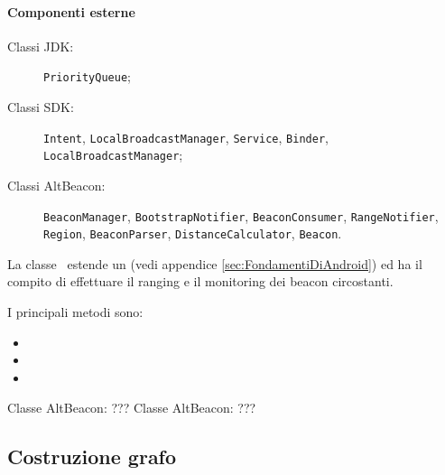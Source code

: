 \documentclass[../Funzionalita.tex]{subfiles}
\begin{document}
			\paragraph*{Componenti esterne}
			\begin{description}
				\item[Classi JDK:] \verb|PriorityQueue|;
				\item[Classi SDK:] \verb|Intent|, \verb|LocalBroadcastManager|, \verb|Service|, \verb|Binder|, \\ \verb|LocalBroadcastManager|;
				\item[Classi AltBeacon:] \verb|BeaconManager|, \verb|BootstrapNotifier|, \verb|BeaconConsumer|, \verb|RangeNotifier|, \verb|Region|, \verb|BeaconParser|,  \verb|DistanceCalculator|, \verb|Beacon|.
			\end{description}
			
			
			La classe \BeaconManagerAdapter\ estende un \Service (vedi appendice \ref{sec:FondamentiDiAndroid}) ed ha il compito di effettuare il ranging e il monitoring dei beacon circostanti. 
			
			I principali metodi sono:
			\begin{itemize}
				\item 
				\item 
				\item 
			\end{itemize}						
			
			Classe AltBeacon:
				???
			Classe AltBeacon:
				???
			
		\subsection{Costruzione grafo}
		
		
		
\end{document}
